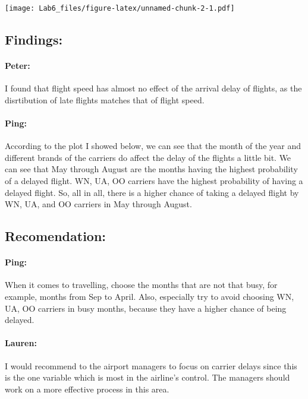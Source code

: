 \documentclass[]{article}
\let\oldparagraph\paragraph
\renewcommand{\paragraph}[1]{\oldparagraph{#1}\mbox{}}
\begin{document}
\texttt{[image: Lab6\_files/figure-latex/unnamed-chunk-2-1.pdf]}

\subsection{Findings:}\label{findings}

\paragraph{Peter:}\label{peter}

I found that flight speed has almost no effect of the arrival delay of
flights, as the disrtibution of late flights matches that of flight
speed.

\paragraph{Ping:}\label{ping}

According to the plot I showed below, we can see that the month of the
year and different brands of the carriers do affect the delay of the
flights a little bit. We can see that May through August are the months
having the highest probability of a delayed flight. WN, UA, OO carriers
have the highest probability of having a delayed flight. So, all in all,
there is a higher chance of taking a delayed flight by WN, UA, and OO
carriers in May through August.

\subsection{Recomendation:}\label{recomendation}

\paragraph{Ping:}\label{ping-1}

When it comes to travelling, choose the months that are not that busy,
for example, months from Sep to April. Also, especially try to avoid
choosing WN, UA, OO carriers in busy months, because they have a higher
chance of being delayed.

\paragraph{Lauren:}\label{lauren}

I would recommend to the airport managers to focus on carrier delays
since this is the one variable which is most in the airline's control.
The managers should work on a more effective process in this area.
\end{document}
